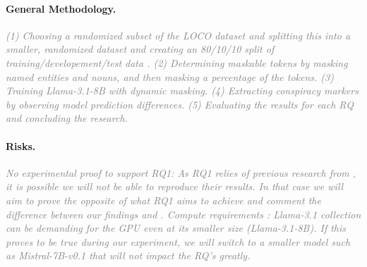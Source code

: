 \documentclass[11pt, a4paper]{article}
\newif\ifinstructions
\newcommand{\explain}[1]{%
  \ifinstructions
    \par\vspace{2pt}%
    {\small\color{exgray} #1}%
    \par\vspace{2pt}%
  \fi
}
\newcommand{\example}[1]{%
  \ifinstructions
    \par\vspace{1pt}%
    {\small\color{exblue} #1}%
    \par\vspace{4pt}%
  \fi
}
\newcommand{\fillhere}[1]{%
  \par\vspace{2pt}%
  \textit{\textcolor{gray}{#1}}%
  \par\vspace{2pt}%
}
\begin{document}
{\paragraph{General Methodology.}
\explain{Describe your experimental pipeline in 3--5 steps. Walk the reader through how you will go from raw data to an answer for each RQ. This does not need to be exhaustive --- just enough to show the plan is concrete and well thought through.}
\example{``(1) Preprocess and reformat WikiAnn splits for all seven target languages. (2) Fine-tune XLM-R and mBERT on the English training split only (zero-shot transfer setup). (3) Evaluate all models on each target language test set and record F\textsubscript{1} per language and entity type (RQ1). (4) Correlate error rates with language-level features such as morphological complexity and script type (RQ2). (5) Apply the pivot-data adaptation strategy and re-evaluate on the three lowest-resource languages (RQ3).''}
\fillhere{(1) Choosing a randomized subset of the LOCO dataset and splitting this into a smaller, randomized dataset and creating an 80/10/10 split of training/developement/test data \citep{fort2023bigfoot}. (2) Determining maskable tokens by masking named entities and nouns, and then masking a percentage of the tokens. (3) Training Llama-3.1-8B with dynamic masking. (4) Extracting conspiracy markers by observing model prediction differences. (5) Evaluating the results for each RQ and concluding the research.}

\paragraph{Risks.}
\explain{What could go wrong? For each risk, state the impact on your RQs, and your mitigation or fallback plan.}
\example{``\textit{Data availability:} WikiAnn coverage for two target languages is sparse ($<$1k sentences); if quality is insufficient we will fall back to silver data generated via projection from a related high-resource language. \textit{Compute:} Fine-tuning XLM-R\textsubscript{large} requires significant GPU memory; if unavailable we will use the base variant, which has been shown to close 85\% of the gap at a fraction of the cost.''}
\fillhere{ \textit{No experimental proof to support RQ1}: As RQ1 relies of previous research from \citep{fort2023bigfoot}, it is possible we will not be able to reproduce their results. In that case we will aim to prove the opposite of what RQ1 aims to achieve and comment the difference between our findings and \citep{fort2023bigfoot}.
\textit{Compute requirements }: Llama-3.1 collection can be demanding for the GPU even at its smaller size (Llama-3.1-8B). If this proves to be true during our experiment, we will switch to a smaller model such as Mistral-7B-v0.1 that will not impact the RQ's greatly.}

}
\end{document}
